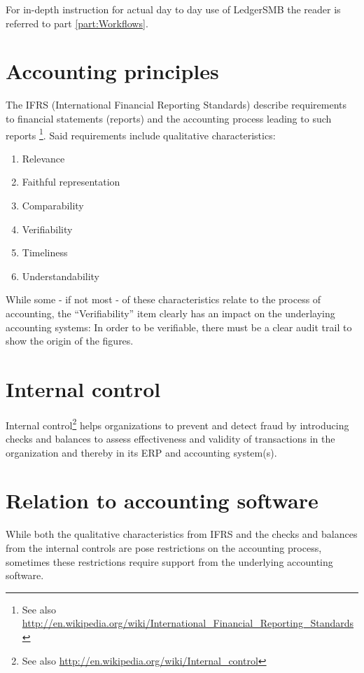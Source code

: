 For in-depth instruction for actual day to day use of LedgerSMB the reader is referred
to part \ref{part:Workflows}.


\section{Accounting principles}

The IFRS (International Financial Reporting Standards) describe requirements
to financial statements (reports) and the accounting process leading to such
reports \footnote{See also \url{http://en.wikipedia.org/wiki/International\_Financial\_Reporting\_Standards}}.
Said requirements include qualitative characteristics:

\begin{enumerate}
\item Relevance
\item Faithful representation
\item Comparability
\item Verifiability
\item Timeliness
\item Understandability
\end{enumerate}

While some - if not most - of these characteristics relate to the process of accounting,
the ``Verifiability'' item clearly has an impact on the underlaying accounting systems:
In order to be verifiable, there must be a clear audit trail to show the origin of the
figures.

\section{Internal control}

Internal control\footnote{See also \url{http://en.wikipedia.org/wiki/Internal\_control}}
helps organizations to prevent and detect fraud by introducing checks and balances
to assess effectiveness and validity of transactions in the organization and thereby
in its ERP and accounting system(s).


\section{Relation to accounting software}
\label{sec:AccountingSystemRequirements}

While both the qualitative characteristics from IFRS and the checks and balances
from the internal controls are pose restrictions on the accounting process,
sometimes these restrictions require support from the underlying accounting
software.

